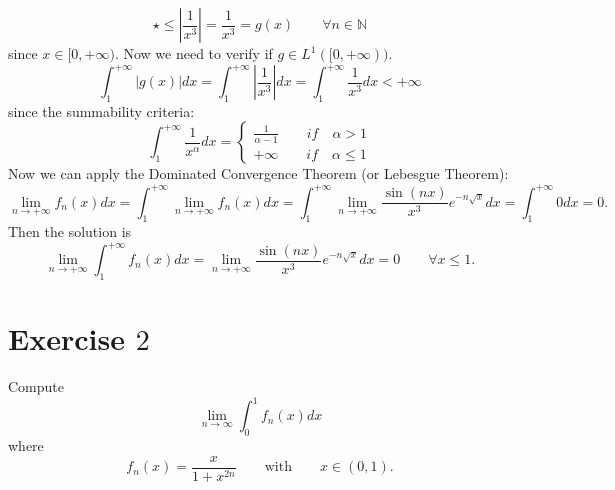\documentclass[a4paper, twoside, openany]{book}
\begin{document}
$$\star \leq |\frac{1}{x^3}| = \frac{1}{x^3} = g(x) \qquad \forall n \in \mathbb{N}$$
since $x \in [0, +\infty)$. Now we need to verify if $g \in L^1([0, +\infty))$. 
$$\int_1^{+\infty} |g(x)| dx = \int_1^{+\infty} |\frac{1}{x^3}| dx = \int_1^{+\infty} \frac{1}{x^3} dx < +\infty$$
since the summability criteria:
$$\int_1^{+\infty} \frac{1}{x^{\alpha}} dx = \begin{cases}
												\frac{1}{\alpha - 1} \qquad if \quad \alpha > 1 \\
												+\infty \qquad if \quad \alpha \leq 1
											\end{cases}$$
Now we can apply the Dominated Convergence Theorem (or Lebesgue Theorem):
$$\lim_{n \rightarrow +\infty} f_n(x) dx = \int_1^{+\infty} \lim_{n \rightarrow +\infty} f_n(x) dx = \int_1^{+\infty} \lim_{n \rightarrow +\infty} \frac{\sin(nx)}{x^3} e^{-n \sqrt{x}} dx = \int_1^{+\infty} 0 dx = 0.$$
Then the solution is
$$\lim_{n \rightarrow + \infty} \int_1^{+\infty} f_n(x) dx = \lim_{n \rightarrow +\infty} \frac{\sin(nx)}{x^3} e^{-n \sqrt{x}} dx = 0 \qquad \forall x \leq 1.$$
\clearpage
\section*{Exercise $2$}
Compute
$$\lim_{n \rightarrow \infty} \int_0^1 f_n(x) dx$$
where 
$$f_n(x) = \frac{x}{1 + x^{2n}} \qquad \textrm{with} \qquad x \in (0, 1).$$
\end{document}
